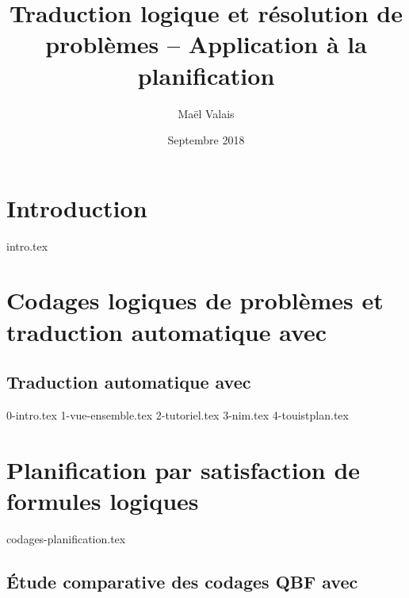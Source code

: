 \documentclass[a4paper,12pt,oneside]{extbook}
\title{Traduction logique et résolution de problèmes -- Application à la planification}
\author{Maël Valais}
\date{Septembre 2018}
\begin{document}
\tableofcontents

\chapter{Introduction}\label{chap:intro}
{intro.tex}



\chapter{Codages logiques de problèmes et traduction automatique avec \touist}

\section{Traduction automatique avec \touist}\label{chap:touist}
{0-intro.tex}
{1-vue-ensemble.tex}
{2-tutoriel.tex}
{3-nim.tex}
{4-touistplan.tex}

\chapter{Planification par satisfaction de formules logiques}
{codages-planification.tex}

\section{Étude comparative des codages QBF avec \touist} %
\end{document}
